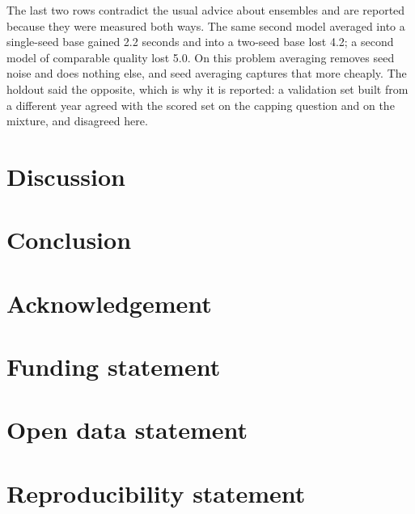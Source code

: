 \documentclass[
  manuscript=article,
  layout=preprint,
  year=2026,
  volume=x,
]{extra/joas}
\begin{document}
The last two rows contradict the usual advice about ensembles and are reported because
they were measured both ways. The same second model averaged into a single-seed base
gained 2.2 seconds and into a two-seed base lost 4.2; a second model of comparable quality
lost 5.0. On this problem averaging removes seed noise and does nothing else, and seed
averaging captures that more cheaply. The holdout said the opposite, which is why it is
reported: a validation set built from a different year agreed with the scored set on the
capping question and on the mixture, and disagreed here.


\section{Discussion}


\section{Conclusion}


\section*{Acknowledgement}

\section*{Funding statement}

\section*{Open data statement}

\section*{Reproducibility statement}

\printbibliography
\end{document}
